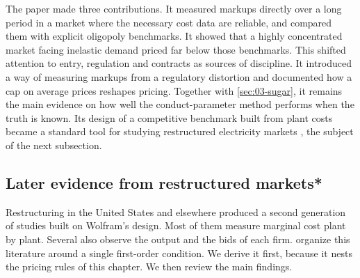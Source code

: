 The paper made three contributions. It measured markups directly over a long period in a market where the necessary
cost data are reliable, and compared them with explicit oligopoly benchmarks. It showed that a highly concentrated
market facing inelastic demand priced far below those benchmarks. This shifted attention to entry, regulation and
contracts as sources of discipline. It introduced a way of measuring markups from a regulatory distortion and documented
how a cap on average prices reshapes pricing. Together with \cref{sec:03-sugar}, it remains the main evidence on how well
the conduct-parameter method performs when the truth is known. Its design of a competitive benchmark built from plant
costs became a standard tool for studying restructured electricity markets \citep[p.~692]{KelloggReguant2021}, the
subject of the next subsection.

\subsection{Later evidence from restructured markets*}\label{sec:03-wolfram-later}

Restructuring in the United States and elsewhere produced a second generation of studies built on Wolfram's design.
Most of them measure marginal cost plant by plant. Several also observe the output and the bids of each firm.
\citet[sec.~4.2]{KelloggReguant2021} organize this literature around a single first-order condition. We derive it first,
because it nests the pricing rules of this chapter. We then review the main findings.

